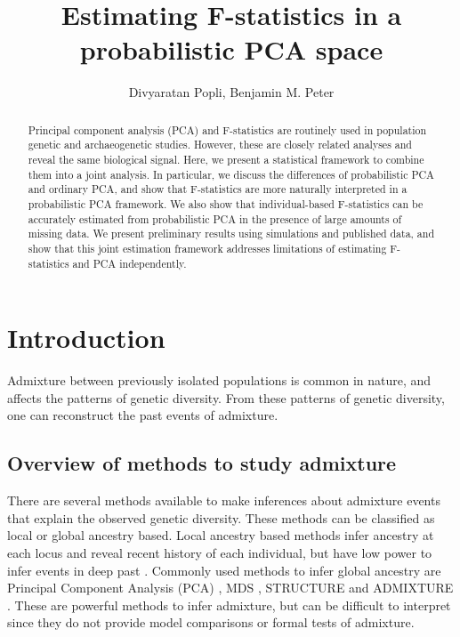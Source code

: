 \documentclass[12pt, letterpaper]{article}
\title{Estimating F-statistics in a probabilistic PCA space}
\author{Divyaratan Popli, Benjamin M. Peter}
\begin{document}
\maketitle


\begin{abstract}

\noindent Principal component analysis (PCA) and F-statistics are routinely used in population genetic and archaeogenetic studies. However, these are closely related analyses and reveal the same biological signal. Here, we present a statistical framework to combine them into a joint analysis. In particular, we discuss the differences of probabilistic PCA and ordinary PCA, and show that F-statistics are more naturally interpreted in a probabilistic PCA framework. We also show that individual-based F-statistics can be accurately estimated from probabilistic PCA in the presence of large amounts of missing data. We present preliminary results using simulations and published data, and show that this joint estimation framework addresses limitations of estimating F-statistics and PCA independently.

\end{abstract}

\section{Introduction}

Admixture between previously isolated populations is common in nature, and affects the patterns of genetic diversity. From these patterns of genetic diversity, one can reconstruct the past events of admixture.  

\subsection{Overview of methods to study admixture}
There are several methods available to make inferences about admixture events that explain the observed genetic diversity. These methods can be classified as local or global ancestry based. Local ancestry based methods infer ancestry at each locus and reveal recent history of each individual, but have low power to infer events in deep past \cite{vi_genome-wide_2023, brisbin_pcadmix_2012, price_sensitive_2009, sankararaman_estimating_2008}. Commonly used methods to infer global ancestry are Principal Component Analysis (PCA) \cite{mcvean_genealogical_2009}, MDS \cite{wang_comparison_2009}, STRUCTURE \cite{pritchard_inference_2000} and ADMIXTURE \cite{alexander_fast_2009}. These are powerful methods to infer admixture, but can be difficult to interpret since they do not provide model comparisons or formal tests of admixture.  
\end{document}
